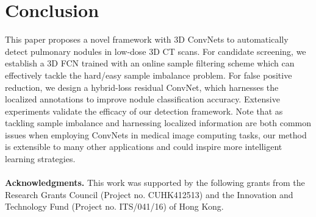 \documentclass{llncs}
\begin{document}
\section{Conclusion}
This paper proposes a novel framework with 3D ConvNets to automatically detect pulmonary nodules in low-dose 3D CT scans.
For candidate screening, we establish a 3D FCN trained with an online sample filtering scheme which can effectively tackle the hard/easy sample imbalance problem.
For false positive reduction, we design a hybrid-loss residual ConvNet, which harnesses the localized annotations to improve nodule classification accuracy.
Extensive experiments validate the efficacy of our detection framework.
Note that as tackling sample imbalance and harnessing localized information are both common issues when employing ConvNets in medical image computing tasks, our method is extensible to many other applications and could inspire more intelligent learning strategies.
\\
\\
\textbf{Acknowledgments.} This work was supported by the following grants from the Research Grants Council (Project no. CUHK412513) and the Innovation and Technology Fund (Project no. ITS/041/16) of Hong Kong.




\end{document}
